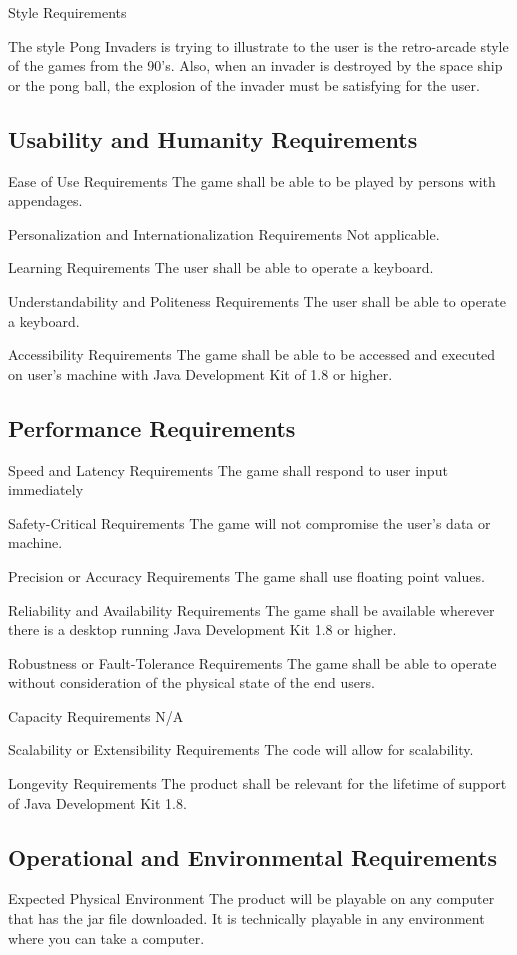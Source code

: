 \documentclass[12pt, titlepage]{article}
\begin{document}
Style Requirements

The style Pong Invaders is trying to illustrate to the user is the retro-arcade style of the games from the 90’s. Also, when an invader is destroyed by the space ship or the pong ball, the explosion of the invader must be satisfying for the user. 


\subsection{Usability and Humanity Requirements}
Ease of Use Requirements 
The game shall be able to be played by persons with appendages. 

Personalization and Internationalization Requirements
Not applicable. 

Learning Requirements 
The user shall be able to operate a keyboard.

Understandability and Politeness Requirements
The user shall be able to operate a keyboard.

Accessibility Requirements 
The game shall be able to be accessed and executed on user’s machine with Java Development Kit of 1.8 or higher. 

\subsection{Performance Requirements}
Speed and Latency Requirements 
The game shall respond to user input immediately

Safety-Critical Requirements 
The game will not compromise the user’s data or machine. 

Precision or Accuracy Requirements 
The game shall use floating point values. 

Reliability and Availability Requirements
The game shall be available wherever there is a desktop running Java Development Kit 1.8 or higher.

Robustness or Fault-Tolerance Requirements 
The game shall be able to operate without consideration of the physical state of the end users.

Capacity Requirements 
N/A

Scalability or Extensibility Requirements 
The code will allow for scalability.

Longevity Requirements 
The product shall be relevant for the lifetime of support of Java Development Kit 1.8.


\subsection{Operational and Environmental Requirements}
Expected Physical Environment
The product will be playable on any computer that has the jar file downloaded. It is technically playable in any environment where you can take a computer.
 
\end{document}
